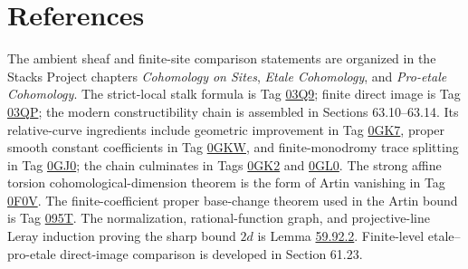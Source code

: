 \documentclass[10pt]{article}
\theoremstyle{definition}
\begin{document}
\section{References}

The ambient sheaf and finite-site comparison statements are organized in the
Stacks Project chapters \emph{Cohomology on Sites}, \emph{Etale Cohomology},
and \emph{Pro-etale Cohomology}.  The strict-local stalk formula is Tag
\href{https://stacks.math.columbia.edu/tag/03Q9}{03Q9}; finite direct image is
Tag \href{https://stacks.math.columbia.edu/tag/03QP}{03QP}; the modern
constructibility chain is assembled in Sections 63.10--63.14.  Its
relative-curve ingredients include geometric improvement in Tag
\href{https://stacks.math.columbia.edu/tag/0GK7}{0GK7}, proper smooth constant
coefficients in Tag \href{https://stacks.math.columbia.edu/tag/0GKW}{0GKW},
and finite-monodromy trace splitting in Tag
\href{https://stacks.math.columbia.edu/tag/0GJ0}{0GJ0}; the chain culminates in
Tags \href{https://stacks.math.columbia.edu/tag/0GK2}{0GK2} and
\href{https://stacks.math.columbia.edu/tag/0GL0}{0GL0}.  The strong affine
torsion cohomological-dimension theorem is the form of Artin vanishing in
Tag \href{https://stacks.math.columbia.edu/tag/0F0V}{0F0V}.  The
finite-coefficient proper base-change theorem used in the Artin bound is Tag
\href{https://stacks.math.columbia.edu/tag/095T}{095T}.  The normalization,
rational-function graph, and projective-line Leray induction proving the
sharp bound $2d$ is Lemma
\href{https://stacks.math.columbia.edu/tag/0A5I}{59.92.2}.  Finite-level
etale--pro-etale direct-image comparison is developed in Section 61.23.
\end{document}
